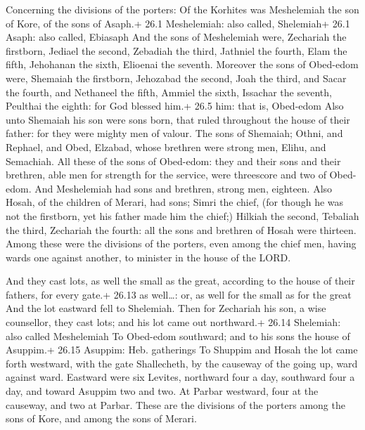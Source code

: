  Concerning the divisions of the porters: Of the Korhites
was Meshelemiah the son of Kore, of the sons of Asaph.+ 26.1
Meshelemiah: also called, Shelemiah+ 26.1 Asaph: also called, Ebiasaph
 And the sons of Meshelemiah were, Zechariah the firstborn,
Jediael the second, Zebadiah the third, Jathniel the fourth,
 Elam the fifth, Jehohanan the sixth, Elioenai the seventh.
 Moreover the sons of Obed-edom were, Shemaiah the
firstborn, Jehozabad the second, Joah the third, and Sacar the fourth,
and Nethaneel the fifth,  Ammiel the sixth, Issachar the
seventh, Peulthai the eighth: for God blessed him.+ 26.5 him: that is,
Obed-edom  Also unto Shemaiah his son were sons born, that
ruled throughout the house of their father: for they were mighty men of
valour.  The sons of Shemaiah; Othni, and Rephael, and Obed,
Elzabad, whose brethren were strong men, Elihu, and Semachiah.
 All these of the sons of Obed-edom: they and their sons and
their brethren, able men for strength for the service, were threescore
and two of Obed-edom.  And Meshelemiah had sons and
brethren, strong men, eighteen.  Also Hosah, of the
children of Merari, had sons; Simri the chief, (for though he was not
the firstborn, yet his father made him the chief;)  Hilkiah
the second, Tebaliah the third, Zechariah the fourth: all the sons and
brethren of Hosah were thirteen.  Among these were the
divisions of the porters, even among the chief men, having wards one
against another, to minister in the house of the LORD.

 And they cast lots, as well the small as the great,
according to the house of their fathers, for every gate.+ 26.13 as
well\ldots: or, as well for the small as for the great  And
the lot eastward fell to Shelemiah. Then for Zechariah his son, a wise
counsellor, they cast lots; and his lot came out northward.+ 26.14
Shelemiah: also called Meshelemiah  To Obed-edom southward;
and to his sons the house of Asuppim.+ 26.15 Asuppim: Heb. gatherings
 To Shuppim and Hosah the lot came forth westward, with the
gate Shallecheth, by the causeway of the going up, ward against ward.
 Eastward were six Levites, northward four a day, southward
four a day, and toward Asuppim two and two.  At Parbar
westward, four at the causeway, and two at Parbar.  These
are the divisions of the porters among the sons of Kore, and among the
sons of Merari.

